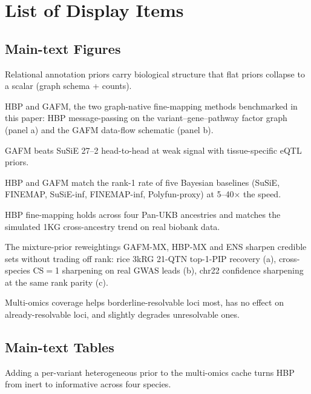 \documentclass[pdflatex,sn-nature]{sn-jnl}
\begin{document}


\clearpage

\section*{List of Display Items}

\subsection*{Main-text Figures}
\begin{description}
\setlength{\itemsep}{2pt}
\item[Figure 1] Relational annotation priors carry biological structure that flat priors collapse to a scalar (graph schema + counts).
\item[Figure 2] HBP and GAFM, the two graph-native fine-mapping methods benchmarked in this paper: HBP message-passing on the variant--gene--pathway factor graph (panel a) and the GAFM data-flow schematic (panel b).
\item[Figure 3] GAFM beats SuSiE 27--2 head-to-head at weak signal with tissue-specific eQTL priors.
\item[Figure 4] HBP and GAFM match the rank-1 rate of five Bayesian baselines (SuSiE, FINEMAP, SuSiE-inf, FINEMAP-inf, Polyfun-proxy) at 5--40$\times$ the speed.
\item[Figure 5] HBP fine-mapping holds across four Pan-UKB ancestries and matches the simulated 1KG cross-ancestry trend on real biobank data.
\item[Figure 6] The mixture-prior reweightings GAFM-MX, HBP-MX and ENS sharpen credible sets without trading off rank: rice 3kRG 21-QTN top-1-PIP recovery (a), cross-species CS$=$1 sharpening on real GWAS leads (b), chr22 confidence sharpening at the same rank parity (c).
\item[Figure 7] Multi-omics coverage helps borderline-resolvable loci most, has no effect on already-resolvable loci, and slightly degrades unresolvable ones.
\end{description}

\subsection*{Main-text Tables}
\begin{description}
\setlength{\itemsep}{2pt}
\item[Table 1] Adding a per-variant heterogeneous prior to the multi-omics cache turns HBP from inert to informative across four species.
\end{description}
\end{document}
